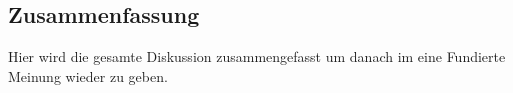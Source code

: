 \subsection{Zusammenfassung}\label{diskussion:zusammenfassung}

Hier wird die gesamte Diskussion zusammengefasst um danach im 
eine Fundierte Meinung wieder zu geben.
